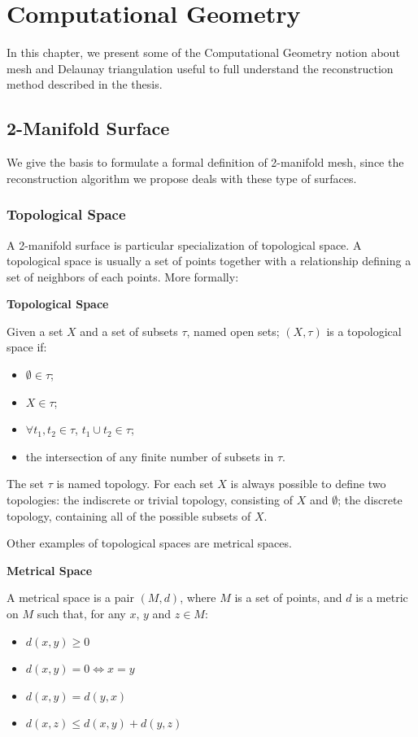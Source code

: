 \chapter{Computational Geometry}
In this chapter, we present some of the Computational Geometry notion about mesh and Delaunay triangulation useful to full understand the reconstruction method described in the thesis. 
\section{2-Manifold Surface}
We give the basis to formulate a formal definition of 2-manifold mesh, since the reconstruction algorithm we propose deals with these type of surfaces. 
\subsection{Topological Space}
A 2-manifold surface is particular specialization of topological space. 
A topological space is usually a set of points together with a  relationship defining a set of neighbors of each points. More formally:
\begin{mydef}
\textbf{Topological Space}

  Given a set $X$ and a set of subsets $\tau$, named open sets; $(X, \tau)$ is a topological space if:
  \begin{itemize}
    \item $\emptyset \in \tau$;
    \item $X \in \tau$;
    \item $\forall t_1,t_2 \in \tau $, $t_1 \cup t_2 \in \tau$;
    \item the intersection of any finite number of subsets in $\tau$.
  \end{itemize}
\end{mydef}
The set $\tau$ is named topology.
For each set $X$ is always possible to define two topologies: the indiscrete or trivial topology, consisting of $X$ and $\emptyset$; the discrete topology, containing all of the possible subsets of $X$.

Other examples of topological spaces are metrical spaces. 
\begin{mydef}
  \textbf{Metrical Space}
  
A metrical space is a pair $(M, d)$, where $M$ is a set of points, and $d$ is a metric on $M$ such that, for any $x$, $y$ and $z \in M$:
\begin{itemize}
  \item $d(x, y) \geq 0$
  \item $d(x, y) = 0 \Longleftrightarrow x = y$
  \item $d(x, y) = d(y, x)$
  \item $d(x, z) \leq d(x, y) + d(y, z)$
\end{itemize}

\end{mydef}


